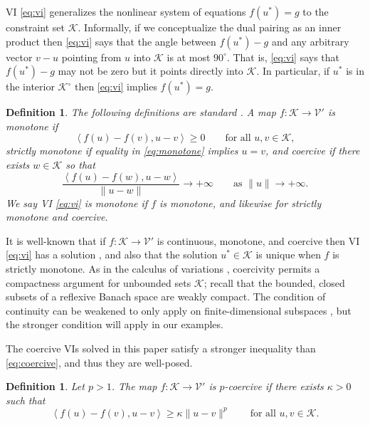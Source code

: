 \documentclass[letterpaper,final,12pt,reqno]{amsart}
\theoremstyle{cstyle}
\theoremstyle{cstyle*}
\theoremstyle{dstyle}
\newtheorem{definition}[theorem]{Definition}
\numberwithin{equation}{section}
\numberwithin{figure}{section}
\numberwithin{table}{section}
\numberwithin{theorem}{section}
\newcommand{\cK}{\mathcal{K}}
\newcommand{\cV}{\mathcal{V}}
\newcommand{\ip}[2]{\left<#1,#2\right>}
\begin{document}
VI \eqref{eq:vi} generalizes the nonlinear system of equations $f(u^*)=g$ to the constraint set $\cK$.  Informally, if we conceptualize the dual pairing as an inner product then \eqref{eq:vi} says that the angle between $f(u^*)-g$ and any arbitrary vector $v-u$ pointing from $u$ into $\cK$ is at most $90^\circ$.  That is, \eqref{eq:vi} says that $f(u^*)-g$ may not be zero but it points directly into $\cK$.  In particular, if $u^*$ is in the interior $\cK^\circ$ then \eqref{eq:vi} implies $f(u^*)=g$.

\begin{definition} The following definitions are standard \cite{KinderlehrerStampacchia1980}.  A map $f:\cK \to \cV'$ is \emph{monotone} if
\begin{equation}
\ip{f(u)-f(v)}{u-v} \ge 0 \qquad \text{for all } u,v \in \cK, \label{eq:monotone}
\end{equation}
\emph{strictly monotone} if equality in \eqref{eq:monotone} implies $u=v$, and \emph{coercive} if there exists $w \in \cK$ so that
\begin{equation}
\frac{\ip{f(u)-f(w)}{u-w}}{\|u-w\|} \to +\infty \qquad \text{as } \|u\|\to +\infty. \label{eq:coercive}
\end{equation}
We say VI \eqref{eq:vi} is \emph{monotone} if $f$ is monotone, and likewise for strictly monotone and coercive. \end{definition}

It is well-known that if $f:\cK \to \cV'$ is continuous, monotone, and coercive then VI \eqref{eq:vi} has a solution \cite[Corollary III.1.8]{KinderlehrerStampacchia1980}, and also that the solution $u^* \in \cK$ is unique when $f$ is strictly monotone.  As in the calculus of variations \cite{Evans2010}, coercivity permits a compactness argument for unbounded sets $\cK$; recall that the bounded, closed subsets of a reflexive Banach space are weakly compact.  The condition of continuity can be weakened to only apply on finite-dimensional subspaces \cite{KinderlehrerStampacchia1980}, but the stronger condition will apply in our examples.

The coercive VIs solved in this paper satisfy a stronger inequality than \eqref{eq:coercive}, and thus they are well-posed.

\begin{definition}  Let $p>1$.  The map $f:\cK \to \cV'$ is \emph{$p$-coercive} if there exists $\kappa>0$ such that
\begin{equation}
\ip{f(u)-f(v)}{u-v} \ge \kappa \|u-v\|^p \qquad \text{for all } u,v \in \cK. \label{eq:pcoercive}
\end{equation}
\end{definition}
\end{document}
